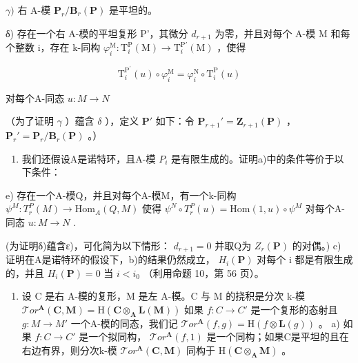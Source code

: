 \(\gamma)\) 右 A-模 \(\mathbf{P}_{r}/\mathbf{B}_{r}(\mathbf{P})\) 是平坦的。

δ) 存在一个右 A-模的平坦复形 P'，其微分 \(d_{r+1}\) 为零，并且对每个 A-模 M 和每个整数 i，存在 k-同构 \(\varphi_{i}^{\mathrm{M}} : \mathrm{T}_{i}^{\mathrm{P}}(\mathrm{M}) \to \mathrm{T}_{i}^{\mathrm{P}'}(\mathrm{M})\) ，使得

\[
\mathrm{T} _ {i} ^ {\mathrm{P} ^ {\prime}} (u) \circ \varphi_ {i} ^ {\mathrm{M}} = \varphi_ {i} ^ {\mathrm{N}} \circ \mathrm{T} _ {i} ^ {\mathrm{P}} (u)
\]

对每个A-同态 \(u:M\to N\)

（为了证明 \(\gamma\) ）蕴含 \(\delta\) ），定义 \(\mathbf{P}'\) 如下：令 \(\mathbf{P}_{r+1}' = \mathbf{Z}_{r+1}(\mathbf{P})\) ， \(\mathbf{P}_r' = \mathbf{P}_r / \mathbf{B}_r(\mathbf{P})\) 。）

\begin{enumerate}
\def\labelenumi{\alph{enumi})}
\setcounter{enumi}{1}
\tightlist
\item
  我们还假设A是诺特环，且A-模 \(P_{i}\) 是有限生成的。证明a)中的条件等价于以下条件：
\end{enumerate}

e) 存在一个A-模Q，并且对每个A-模M，有一个k-同构 \(\psi^{M}: T_{r}^{P}(M) \to \text{Hom}_{A}(Q, M)\) 使得 \(\psi^{N} \circ T_{r}^{P}(u) = \text{Hom}(1, u) \circ \psi^{M}\) 对每个A-同态 \(u: M \to N\) .

(为证明δ)蕴含ε)，可化简为以下情形： \(d_{r+1} = 0\) 并取Q为 \(Z_{r}(\mathbf{P})\) 的对偶。) c) 证明在A是诺特环的假设下，b)的结果仍然成立， \(H_{i}(\mathbf{P})\) 对每个 i 都是有限生成的，并且 \(H_{i}(\mathbf{P}) = 0\) 当 \(i < i_{0}\) （利用命题 10，第 56 页）。

\begin{enumerate}
\def\labelenumi{\arabic{enumi})}
\setcounter{enumi}{6}
\tightlist
\item
  设 C 是右 A-模的复形，M 是左 A-模。C 与 M 的挠积是分次 k-模 \(\mathcal{T}or^{\mathbf{A}}(\mathbf{C},\mathbf{M})=\mathrm{H}(\mathbf{C}\otimes_{\mathbf{A}}\mathbf{L}(\mathbf{M}))\) 如果 \(f:C\to C'\) 是一个复形的态射且 \(g:M\to M'\) 一个A-模的同态，我们记 \(\mathcal{T}or^{\mathbf{A}}(f,g)=\mathrm{H}(f\otimes\mathbf{L}(g))\) 。 a) 如果 \(f:C\to C'\) 是一个拟同构， \(\mathcal{T}or^{\mathbf{A}}(f,1)\) 是一个同构；如果C是平坦的且在右边有界，则分次k-模 \(\mathcal{T}or^{\mathbf{A}}(\mathbf{C},\mathbf{M})\) 同构于 \(\mathrm{H}(\mathbf{C}\otimes_{\mathbf{A}}\mathbf{M})\) 。
\end{enumerate}

